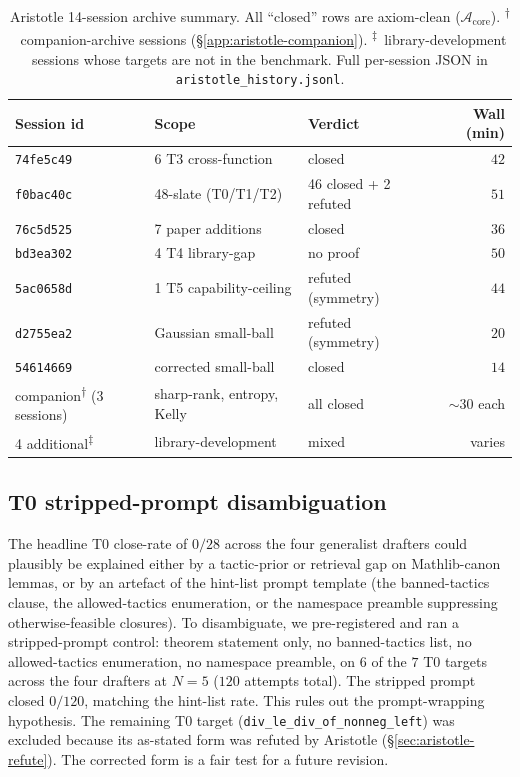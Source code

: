 \begin{table}[!t]
\centering
\small
\caption{Aristotle 14-session archive summary. All
``closed'' rows are axiom-clean
($\mathcal{A}_{\text{core}}$).
\textsuperscript{$\dagger$}~companion-archive sessions
(\S\ref{app:aristotle-companion}).
\textsuperscript{$\ddagger$}~library-development sessions whose
targets are not in the benchmark. Full per-session JSON in
\texttt{aristotle\_history.jsonl}.}
\label{tab:aristotle-sessions}
\begin{tabular}{lp{3.5cm}p{4cm}r}
\toprule
Session id & Scope & Verdict & Wall (min) \\
\midrule
\texttt{74fe5c49} & 6 T3 cross-function & closed & $42$ \\
\texttt{f0bac40c} & 48-slate (T0/T1/T2) & 46 closed + 2 refuted & $51$ \\
\texttt{76c5d525} & 7 paper additions & closed & $36$ \\
\texttt{bd3ea302} & 4 T4 library-gap & no proof & $50$ \\
\texttt{5ac0658d} & 1 T5 capability-ceiling & refuted (symmetry) & $44$ \\
\texttt{d2755ea2} & Gaussian small-ball & refuted (symmetry) & $20$ \\
\texttt{54614669} & corrected small-ball & closed & $14$ \\
companion\textsuperscript{$\dagger$} (3 sessions) & sharp-rank, entropy, Kelly & all closed & $\sim 30$ each \\
4 additional\textsuperscript{$\ddagger$} & library-development & mixed & varies \\
\bottomrule
\end{tabular}

\end{table}

\subsection{T0 stripped-prompt disambiguation}
\label{app:t0-stripped-prompt}

The headline T0 close-rate of $0/28$ across the four generalist
drafters could plausibly be explained either by a tactic-prior or
retrieval gap on Mathlib-canon lemmas, or by an artefact of the
hint-list prompt template (the banned-tactics clause, the
allowed-tactics enumeration, or the namespace preamble suppressing
otherwise-feasible closures). To disambiguate, we pre-registered and
ran a stripped-prompt control: theorem statement only, no
banned-tactics list, no allowed-tactics enumeration, no namespace
preamble, on $6$ of the $7$ T0 targets across the four drafters at
$N=5$ ($120$ attempts total). The stripped prompt closed $0/120$,
matching the hint-list rate. This rules out the prompt-wrapping
hypothesis. The remaining T0 target
(\texttt{div\_le\_div\_of\_nonneg\_left}) was excluded because
its as-stated form was refuted by Aristotle
(\S\ref{sec:aristotle-refute}). The corrected form is a fair test
for a future revision.

